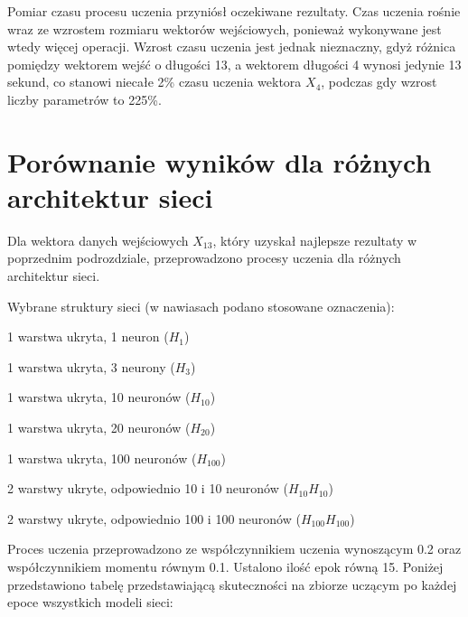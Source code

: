 Pomiar czasu procesu uczenia przyniósł oczekiwane rezultaty. Czas uczenia rośnie wraz ze wzrostem rozmiaru wektorów wejściowych, ponieważ wykonywane jest wtedy więcej operacji. Wzrost czasu uczenia jest jednak nieznaczny, gdyż różnica pomiędzy wektorem wejść o długości 13, a wektorem długości 4 wynosi jedynie 13 sekund, co stanowi niecałe 2\% czasu uczenia wektora $X_4$, podczas gdy wzrost liczby parametrów to 225\%. 

\section{Porównanie wyników dla różnych architektur sieci}
\label{Sec:VsArch}
Dla wektora danych wejściowych $X_{13}$, który uzyskał najlepsze rezultaty w poprzednim podrozdziale, przeprowadzono procesy uczenia dla różnych architektur sieci. 

Wybrane struktury sieci (w nawiasach podano stosowane oznaczenia):
\begin{tightitemize}
\item 1 warstwa ukryta, 1 neuron ($H_{1}$)
\item 1 warstwa ukryta, 3 neurony ($H_{3}$)
\item 1 warstwa ukryta, 10 neuronów ($H_{10}$)
\item 1 warstwa ukryta, 20 neuronów ($H_{20}$)
\item 1 warstwa ukryta, 100 neuronów ($H_{100}$)
\item 2 warstwy ukryte, odpowiednio 10 i 10 neuronów ($H_{10}H_{10}$)
\item 2 warstwy ukryte, odpowiednio 100 i 100 neuronów ($H_{100}H_{100}$)
\end{tightitemize}

Proces uczenia przeprowadzono ze współczynnikiem uczenia wynoszącym 0.2 oraz współczynnikiem momentu równym 0.1. Ustalono ilość epok równą 15. Poniżej przedstawiono tabelę przedstawiającą skuteczności na zbiorze uczącym po każdej epoce wszystkich modeli sieci:

